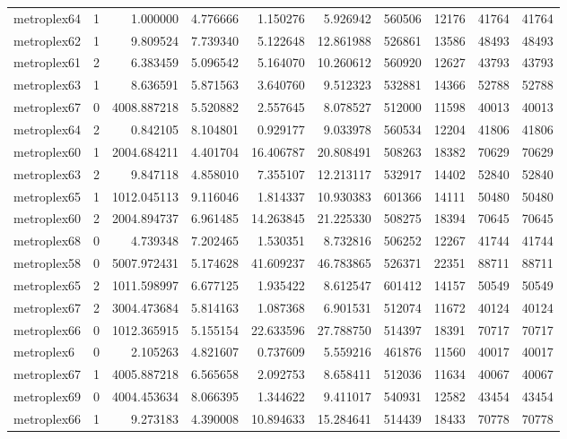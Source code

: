 \begin{longtable}{|l|r|r|r|r|r|r|r|r|r|}
metroplex64 & 1 & 1.000000 & 4.776666 & 1.150276 & 5.926942 & 560506 & 12176 & 41764 & 41764 \\
metroplex62 & 1 & 9.809524 & 7.739340 & 5.122648 & 12.861988 & 526861 & 13586 & 48493 & 48493 \\
metroplex61 & 2 & 6.383459 & 5.096542 & 5.164070 & 10.260612 & 560920 & 12627 & 43793 & 43793 \\
metroplex63 & 1 & 8.636591 & 5.871563 & 3.640760 & 9.512323 & 532881 & 14366 & 52788 & 52788 \\
metroplex67 & 0 & 4008.887218 & 5.520882 & 2.557645 & 8.078527 & 512000 & 11598 & 40013 & 40013 \\
metroplex64 & 2 & 0.842105 & 8.104801 & 0.929177 & 9.033978 & 560534 & 12204 & 41806 & 41806 \\
metroplex60 & 1 & 2004.684211 & 4.401704 & 16.406787 & 20.808491 & 508263 & 18382 & 70629 & 70629 \\
metroplex63 & 2 & 9.847118 & 4.858010 & 7.355107 & 12.213117 & 532917 & 14402 & 52840 & 52840 \\
metroplex65 & 1 & 1012.045113 & 9.116046 & 1.814337 & 10.930383 & 601366 & 14111 & 50480 & 50480 \\
metroplex60 & 2 & 2004.894737 & 6.961485 & 14.263845 & 21.225330 & 508275 & 18394 & 70645 & 70645 \\
metroplex68 & 0 & 4.739348 & 7.202465 & 1.530351 & 8.732816 & 506252 & 12267 & 41744 & 41744 \\
metroplex58 & 0 & 5007.972431 & 5.174628 & 41.609237 & 46.783865 & 526371 & 22351 & 88711 & 88711 \\
metroplex65 & 2 & 1011.598997 & 6.677125 & 1.935422 & 8.612547 & 601412 & 14157 & 50549 & 50549 \\
metroplex67 & 2 & 3004.473684 & 5.814163 & 1.087368 & 6.901531 & 512074 & 11672 & 40124 & 40124 \\
metroplex66 & 0 & 1012.365915 & 5.155154 & 22.633596 & 27.788750 & 514397 & 18391 & 70717 & 70717 \\
metroplex6 & 0 & 2.105263 & 4.821607 & 0.737609 & 5.559216 & 461876 & 11560 & 40017 & 40017 \\
metroplex67 & 1 & 4005.887218 & 6.565658 & 2.092753 & 8.658411 & 512036 & 11634 & 40067 & 40067 \\
metroplex69 & 0 & 4004.453634 & 8.066395 & 1.344622 & 9.411017 & 540931 & 12582 & 43454 & 43454 \\
metroplex66 & 1 & 9.273183 & 4.390008 & 10.894633 & 15.284641 & 514439 & 18433 & 70778 & 70778 \\

\end{longtable}
